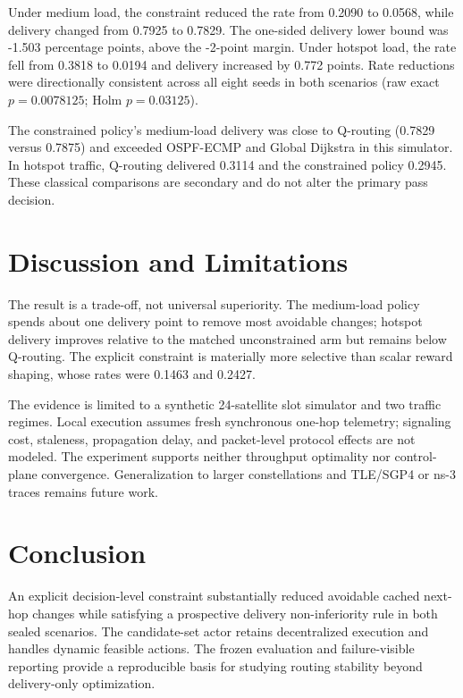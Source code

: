 \documentclass[conference]{IEEEtran}
\begin{document}
Under medium load, the constraint reduced the rate from 0.2090 to 0.0568,
while delivery changed from 0.7925 to 0.7829. The one-sided delivery lower
bound was -1.503 percentage points, above the -2-point margin. Under hotspot
load, the rate fell from 0.3818 to 0.0194 and delivery increased by 0.772
points. Rate reductions were directionally consistent across all eight seeds
in both scenarios (raw exact $p=0.0078125$; Holm $p=0.03125$).

The constrained policy's medium-load delivery was close to Q-routing
(0.7829 versus 0.7875) and exceeded OSPF-ECMP and Global Dijkstra in this
simulator. In hotspot traffic, Q-routing delivered 0.3114 and the constrained
policy 0.2945. These classical comparisons are secondary and do not alter the
primary pass decision.

\section{Discussion and Limitations}
The result is a trade-off, not universal superiority. The medium-load policy
spends about one delivery point to remove most avoidable changes; hotspot
delivery improves relative to the matched unconstrained arm but remains below
Q-routing. The explicit constraint is materially more selective than scalar
reward shaping, whose rates were 0.1463 and 0.2427.

The evidence is limited to a synthetic 24-satellite slot simulator and two
traffic regimes. Local execution assumes fresh synchronous one-hop telemetry;
signaling cost, staleness, propagation delay, and packet-level protocol effects
are not modeled. The experiment supports neither throughput optimality nor
control-plane convergence. Generalization to larger constellations and
TLE/SGP4 or ns-3 traces remains future work.

\section{Conclusion}
An explicit decision-level constraint substantially reduced avoidable cached
next-hop changes while satisfying a prospective delivery non-inferiority rule
in both sealed scenarios. The candidate-set actor retains decentralized
execution and handles dynamic feasible actions. The frozen evaluation and
failure-visible reporting provide a reproducible basis for studying routing
stability beyond delivery-only optimization.
\end{document}
